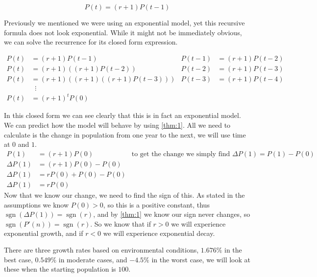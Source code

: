 \documentclass{article}
\DeclareMathOperator{\sgn}{sgn}
\begin{document}
\begin{equation} \label{eq:basic-recursive-exponential}
    P(t) = (r+1)P(t-1)
\end{equation}

Previously we mentioned we were using an exponential model, yet this recursive formula does not look exponential. While it might not be immediately obvious, we can solve the recurrence for its closed form expression.

\begin{align}\label{eq:basic-closed}
    P(t) &= (r+1)P(t-1) & P(t-1) &= (r+1)P(t-2) \nonumber \\
    P(t) &= (r+1)\left((r+1)P(t-2)\right) & P(t-2) &= (r+1)P(t-3) \nonumber \\
    P(t) &= (r+1)\left((r+1)\left((r+1)P(t-3)\right)\right) & P(t-3) &= (r+1)P(t-4) \nonumber \\
    &\phantom{x}\vdots \nonumber \\
    P(t) &= (r+1)^tP(0)
\end{align}

In this closed form we can see clearly that this is in fact an exponential model. We can predict how the model will behave by using \cref{thm:1}. All we need to calculate is the change in population from one year to the next, we will use time at $0$ and $1$.
\begin{align*}
    P(1) &= (r+1)P(0) & \text{to get the change we simply find } \Delta P(1)=P(1)-P(0)\\
    \Delta P(1) &= (r+1)P(0)-P(0) \\
    \Delta P(1) &= rP(0) + P(0) - P(0) \\
    \Delta P(1) &= rP(0)
\end{align*}
Now that we know our change, we need to find the sign of this. As stated in the assumptions we know $P(0)>0$, so this is a positive constant, thus $\sgn(\Delta P(1)) = \sgn(r)$, and by \cref{thm:1} we know our sign never changes, so $\sgn(P'(n))=\sgn(r)$. So we know that if $r > 0$ we will experience exponential growth, and if $r < 0$ we will experience exponential decay.


There are three growth rates based on environmental conditions, $1.676\%$ in the best case, $0.549\%$ in moderate cases, and $-4.5\%$ in the worst case, we will look at these when the starting population is $100$.
\end{document}
